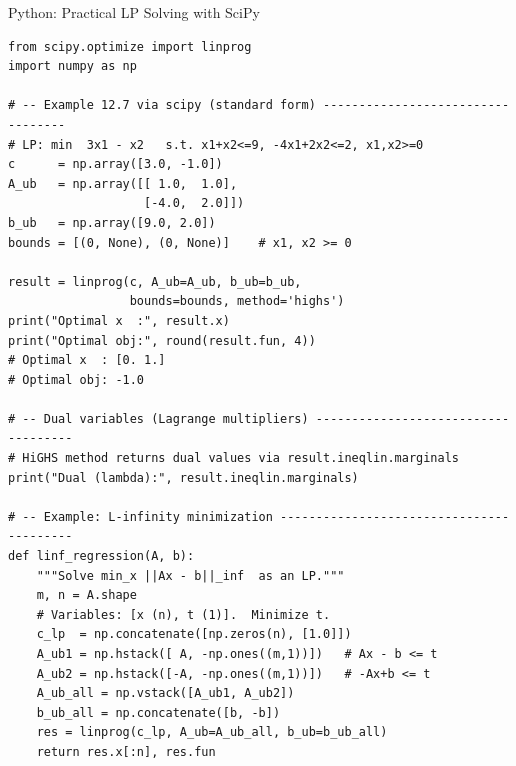 \documentclass[aspectratio=169,10pt]{beamer}
\begin{document}
\begin{frame}[fragile]{Python: Practical LP Solving with SciPy}
\begin{lstlisting}
from scipy.optimize import linprog
import numpy as np

# -- Example 12.7 via scipy (standard form) ----------------------------------
# LP: min  3x1 - x2   s.t. x1+x2<=9, -4x1+2x2<=2, x1,x2>=0
c      = np.array([3.0, -1.0])
A_ub   = np.array([[ 1.0,  1.0],
                   [-4.0,  2.0]])
b_ub   = np.array([9.0, 2.0])
bounds = [(0, None), (0, None)]    # x1, x2 >= 0

result = linprog(c, A_ub=A_ub, b_ub=b_ub,
                 bounds=bounds, method='highs')
print("Optimal x  :", result.x)
print("Optimal obj:", round(result.fun, 4))
# Optimal x  : [0. 1.]
# Optimal obj: -1.0

# -- Dual variables (Lagrange multipliers) ------------------------------------
# HiGHS method returns dual values via result.ineqlin.marginals
print("Dual (lambda):", result.ineqlin.marginals)

# -- Example: L-infinity minimization -----------------------------------------
def linf_regression(A, b):
    """Solve min_x ||Ax - b||_inf  as an LP."""
    m, n = A.shape
    # Variables: [x (n), t (1)].  Minimize t.
    c_lp  = np.concatenate([np.zeros(n), [1.0]])
    A_ub1 = np.hstack([ A, -np.ones((m,1))])   # Ax - b <= t
    A_ub2 = np.hstack([-A, -np.ones((m,1))])   # -Ax+b <= t
    A_ub_all = np.vstack([A_ub1, A_ub2])
    b_ub_all = np.concatenate([b, -b])
    res = linprog(c_lp, A_ub=A_ub_all, b_ub=b_ub_all)
    return res.x[:n], res.fun
\end{lstlisting}
\end{frame}
\end{document}
